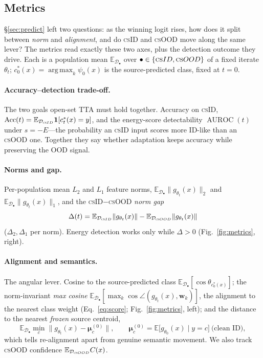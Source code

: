 \documentclass[11pt]{article}
\newcommand{\csid}{\textsc{cs}ID}
\newcommand{\csood}{\textsc{cs}OOD}
\newcommand{\D}{\mathcal{D}}
\newcommand{\norm}[1]{\lVert #1 \rVert}
\DeclareMathOperator*{\argmax}{arg\,max}
\DeclareMathOperator{\AUROC}{AUROC}
\newcommand{\E}{\mathbb{E}}
\newcommand{\Ind}{\mathbf{1}}
\newcommand{\Energy}{E}
\newcommand{\gz}{g_{\theta_0}}
\newcommand{\gt}{g_{\theta_t}}
\begin{document}
\subsection{Metrics}\label{sec:metrics}

\S\ref{sec:predict} left two questions: as the winning logit rises, how
does it split between \emph{norm} and \emph{alignment}, and do \csid{} and
\csood{} move along the same lever? The metrics read exactly these two
axes, plus the detection outcome they drive. Each is a population mean
$\E_{\D_\bullet}$ over $\bullet\in\{\csid,\csood\}$ of a fixed iterate
$\theta_t$; $c^*_0(x)=\argmax_k\psi_0(x)$ is the source-predicted class,
fixed at $t{=}0$.

\paragraph{Accuracy--detection trade-off.} The two goals open-set TTA must
hold together. Accuracy on \csid,
$\mathrm{Acc}(t)=\E_{\D_{\csid}}\Ind[c^*_t(x)=y]$, and the energy-score
detectability $\AUROC(t)$ under $s=-\Energy$---the probability an \csid{}
input scores more ID-like than an \csood{} one. Together they say whether
adaptation keeps accuracy while preserving the OOD signal.

\paragraph{Norms and gap.} Per-population mean $L_2$ and $L_1$ feature
norms, $\E_{\D_\bullet}\norm{\gt(x)}_2$ and $\E_{\D_\bullet}\norm{\gt(x)}_1$,
and the \csid$-$\csood{} \emph{norm gap}
\begin{equation}\label{eq:gap}
\Delta(t)=\E_{\D_{\csid}}\norm{\gt(x)}-\E_{\D_{\csood}}\norm{\gt(x)}
\end{equation}
($\Delta_2,\Delta_1$ per norm). Energy detection works only while
$\Delta>0$ (Fig.~\ref{fig:metrics}, right).

\paragraph{Alignment and semantics.} The angular lever. Cosine to the
source-predicted class $\E_{\D_\bullet}[\cos\theta_{c^*_0(x)}]$; the
norm-invariant \emph{max cosine}
$\E_{\D_\bullet}[\max_k\cos\angle(\gt(x),\mathbf{w}_k)]$, the alignment to
the nearest class weight (Eq.~\eqref{eq:score}; Fig.~\ref{fig:metrics},
left); and the distance to the nearest \emph{frozen} source centroid,
\begin{equation}\label{eq:centroid}
\E_{\D_\bullet}\min_{c}\norm{\gt(x)-\bm{\mu}_c^{(0)}},
\qquad
\bm{\mu}_c^{(0)}=\E\big[\gz(x)\mid y=c\big]\ \text{(clean ID)},
\end{equation}
which tells re-alignment apart from genuine semantic movement. We also
track \csood{} confidence $\E_{\D_{\csood}}C(x)$.
\end{document}
